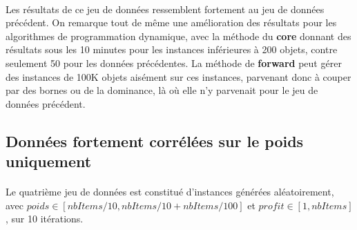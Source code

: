 \documentclass[12pt]{article}
\begin{document}
\paragraph{}Les résultats de ce jeu de données ressemblent fortement au jeu de données précédent. On remarque tout de même une amélioration des résultats pour les algorithmes de programmation dynamique, avec la méthode du \textbf{core} donnant des résultats sous les 10 minutes pour les instances inférieures à 200 objets, contre seulement 50 pour les données précédentes. La méthode de \textbf{forward} peut gérer des instances de 100K objets aisément sur ces instances, parvenant donc à couper par des bornes ou de la dominance, là où elle n'y parvenait pour le jeu de données précédent.

\subsection{Données fortement corrélées sur le poids uniquement}

\paragraph{}Le quatrième jeu de données est constitué d'instances générées aléatoirement, avec $poids \in [nbItems/10, nbItems/10+nbItems/100]$ et $profit \in [1,nbItems]$, sur 10 itérations.

\begin{figure}[!h]
\begin{floatrow}
\end{floatrow}
\end{figure}
\end{document}
